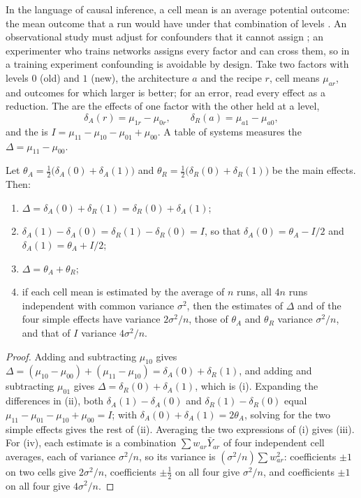 \begin{refsection}
In the language of causal inference, a cell mean is an average potential outcome: the mean outcome that a run would have under that combination of levels \parencite{ImbensRubin2015}. An observational study must adjust for confounders that it cannot assign \parencite{Pearl2009}; an experimenter who trains networks assigns every factor and can cross them, so in a training experiment confounding is avoidable by design. Take two factors with levels $0$ (old) and $1$ (new), the architecture $a$ and the recipe $r$, cell means $\mu_{ar}$, and outcomes for which larger is better; for an error, read every effect as a reduction. The  are the effects of one factor with the other held at a level,
\[
\delta_A(r)=\mu_{1r}-\mu_{0r},\qquad\delta_R(a)=\mu_{a1}-\mu_{a0},
\]
and the  is $I=\mu_{11}-\mu_{10}-\mu_{01}+\mu_{00}$. A table of systems measures the  $\Delta=\mu_{11}-\mu_{00}$.

\begin{proposition}\label{prop:confounding:twobytwo}
Let $\theta_A=\frac12\bigl(\delta_A(0)+\delta_A(1)\bigr)$ and $\theta_R=\frac12\bigl(\delta_R(0)+\delta_R(1)\bigr)$ be the main effects. Then:
\begin{enumerate}
\item $\Delta=\delta_A(0)+\delta_R(1)=\delta_R(0)+\delta_A(1)$;
\item $\delta_A(1)-\delta_A(0)=\delta_R(1)-\delta_R(0)=I$, so that $\delta_A(0)=\theta_A-I/2$ and $\delta_A(1)=\theta_A+I/2$;
\item $\Delta=\theta_A+\theta_R$;
\item if each cell mean is estimated by the average of $n$ runs, all $4n$ runs independent with common variance $\sigma^2$, then the estimates of $\Delta$ and of the four simple effects have variance $2\sigma^2/n$, those of $\theta_A$ and $\theta_R$ variance $\sigma^2/n$, and that of $I$ variance $4\sigma^2/n$.
\end{enumerate}
\end{proposition}

\begin{proof}
Adding and subtracting $\mu_{10}$ gives $\Delta=(\mu_{10}-\mu_{00})+(\mu_{11}-\mu_{10})=\delta_A(0)+\delta_R(1)$, and adding and subtracting $\mu_{01}$ gives $\Delta=\delta_R(0)+\delta_A(1)$, which is (i). Expanding the differences in (ii), both $\delta_A(1)-\delta_A(0)$ and $\delta_R(1)-\delta_R(0)$ equal $\mu_{11}-\mu_{01}-\mu_{10}+\mu_{00}=I$; with $\delta_A(0)+\delta_A(1)=2\theta_A$, solving for the two simple effects gives the rest of (ii). Averaging the two expressions of (i) gives (iii). For (iv), each estimate is a combination $\sum w_{ar}\bar Y_{ar}$ of four independent cell averages, each of variance $\sigma^2/n$, so its variance is $(\sigma^2/n)\sum w_{ar}^2$: coefficients $\pm1$ on two cells give $2\sigma^2/n$, coefficients $\pm\frac12$ on all four give $\sigma^2/n$, and coefficients $\pm1$ on all four give $4\sigma^2/n$.
\end{proof}


\end{refsection}
